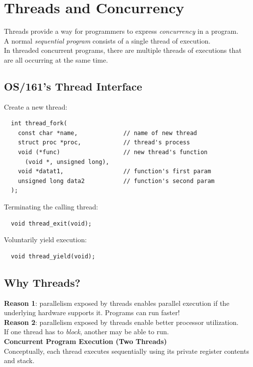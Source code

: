\documentclass[12pt]{article}
\theoremstyle{plain}
\theoremstyle{definition}
\begin{document}
\newpage
\section{Threads and Concurrency}
Threads provide a way for programmers to express \emph{concurrency} in a program. \\
A normal \emph{sequential program} consists of a single thread of execution. \\
In threaded concurrent programs, there are multiple threads of executions that are all occurring at the same time.

\subsection{OS/161's Thread Interface}
Create a new thread:
\begin{verbatim}
  int thread_fork(
    const char *name,             // name of new thread
    struct proc *proc,            // thread's process
    void (*func)                  // new thread's function
      (void *, unsigned long),
    void *datat1,                 // function's first param
    unsigned long data2           // function's second param
  );
\end{verbatim}

Terminating the calling thread:
\begin{verbatim}
  void thread_exit(void);
\end{verbatim}

Voluntarily yield execution:
\begin{verbatim}
  void thread_yield(void);
\end{verbatim}

\subsection{Why Threads?}
\textbf{Reason 1}: parallelism exposed by threads enables parallel execution if the underlying hardware supports it.
Programs can run faster! \\

\textbf{Reason 2}: parallelism exposed by threads enable better processor utilization. \\
If one thread has to \emph{block}, another may be able to run. \\

\textbf{Concurrent Program Execution (Two Threads)} \\
Conceptually, each thread executes sequentially using its private register contents and stack.
\end{document}
